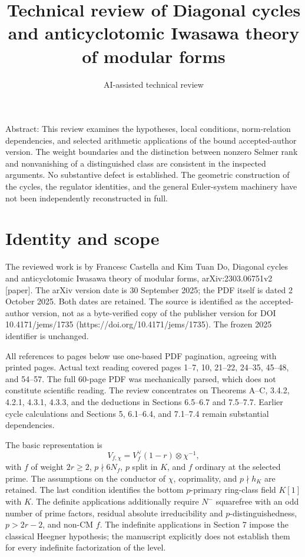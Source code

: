 \documentclass[10pt]{article}
\title{Technical review of Diagonal cycles and anticyclotomic Iwasawa theory of modular forms}
\author{AI-assisted technical review}
\date{}
\begin{document}
\maketitle
Abstract: This review examines the hypotheses, local conditions, norm-relation dependencies, and selected arithmetic applications of the bound accepted-author version. The weight boundaries and the distinction between nonzero Selmer rank and nonvanishing of a distinguished class are consistent in the inspected arguments. No substantive defect is established. The geometric construction of the cycles, the regulator identities, and the general Euler-system machinery have not been independently reconstructed in full.\par
\section*{Identity and scope}
The reviewed work is by Francesc Castella and Kim Tuan Do, Diagonal cycles and anticyclotomic Iwasawa theory of modular forms, arXiv:2303.06751v2 [paper]. The arXiv version date is 30 September 2025; the PDF itself is dated 2 October 2025. Both dates are retained. The source is identified as the accepted-author version, not as a byte-verified copy of the publisher version for DOI 10.4171/jems/1735 (https://doi.org/10.4171/jems/1735). The frozen 2025 identifier is unchanged.\par
All references to pages below use one-based PDF pagination, agreeing with printed pages. Actual text reading covered pages 1–7, 10, 21–22, 24–35, 45–48, and 54–57. The full 60-page PDF was mechanically parsed, which does not constitute scientific reading. The review concentrates on Theorems A–C, 3.4.2, 4.2.1, 4.3.1, 4.3.3, and the deductions in Sections 6.5–6.7 and 7.5–7.7. Earlier cycle calculations and Sections 5, 6.1–6.4, and 7.1–7.4 remain substantial dependencies.\par
The basic representation is \[V_{f,\chi}=V_f^\vee(1-r)\otimes\chi^{-1},\] with \(f\) of weight \(2r\geq2\), \(p\nmid6N_f\), \(p\) split in \(K\), and \(f\) ordinary at the selected prime. The assumptions on the conductor of \(\chi\), coprimality, and \(p\nmid h_K\) are retained. The last condition identifies the bottom \(p\)-primary ring-class field \(K[1]\) with \(K\). The definite applications additionally require \(N^-\) squarefree with an odd number of prime factors, residual absolute irreducibility and \(p\)-distinguishedness, \(p>2r-2\), and non-CM \(f\). The indefinite applications in Section 7 impose the classical Heegner hypothesis; the manuscript explicitly does not establish them for every indefinite factorization of the level.\par
\end{document}
